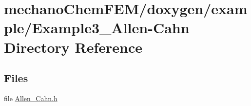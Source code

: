 \section{mechano\-Chem\-F\-E\-M/doxygen/example/\-Example3\-\_\-\-Allen-\/\-Cahn Directory Reference}
\label{dir_9e85432634f69504a3a2566849bf36bb}
\subsection*{Files}
\begin{DoxyCompactItemize}
\item 
file \hyperlink{_allen___cahn_8h}{Allen\-\_\-\-Cahn.\-h}
\end{DoxyCompactItemize}
